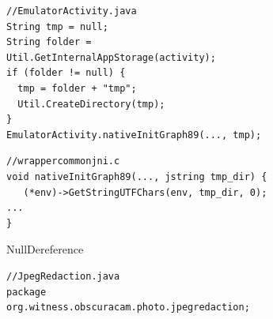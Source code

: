 \begin{figure}[t]
  \centering
  \vspace{2mm}
  \begin{subfigure}[t]{0.5\textwidth}
    \begin{lstlisting}[style=java,xleftmargin=2.5em]
//EmulatorActivity.java
String tmp = null;
String folder = Util.GetInternalAppStorage(activity);
if (folder != null) {
  tmp = folder + "tmp";
  Util.CreateDirectory(tmp);
}
EmulatorActivity.nativeInitGraph89(..., tmp);
    \end{lstlisting}
    \begin{lstlisting}[style=cpp,xleftmargin=2.5em]
//wrappercommonjni.c
void nativeInitGraph89(..., jstring tmp_dir) {
   (*env)->GetStringUTFChars(env, tmp_dir, 0); ...
}
    \end{lstlisting}
    \vspace*{-.5em}
    \caption{NullDereference}
    \label{fig:bug1}
  \end{subfigure}
  \begin{subfigure}[t]{0.5\textwidth}
    \begin{lstlisting}[style=java,xleftmargin=2.5em]
//JpegRedaction.java
package org.witness.obscuracam.photo.jpegredaction;


\end{lstlisting}
\end{subfigure}
\end{figure}
